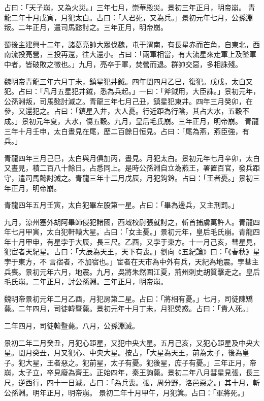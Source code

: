 \begin{pinyinscope}
 占曰：「天子崩，又為火災。」三年七月，崇華殿災。景初三年正月，明帝崩。
 青龍二年十月戊寅，月犯太白。占曰：「人君死，又為兵。」景初元年七月，公孫淵叛。二年正月，遣司馬懿討之。三年正月，明帝崩。



 蜀後主建興十二年，諸葛亮帥大眾伐魏，屯于渭南，有長星赤而芒角，自東北，西南流投亮營，三投再還，往大還小。占曰：「兩軍相當，有大流星來走軍上及墜軍中者，皆破敗之徵也。」九月，亮卒于軍，焚營而退。群帥交惡，多相誅殘。



 魏明帝青龍三年六月丁未，鎮星犯井鉞。四年閏四月乙巳，復犯。戊戌，太白又犯。占曰：「凡月五星犯井鉞，悉為兵起。」一曰：「斧鉞用，大臣誅。」景初元年，公孫淵叛，司馬懿討滅之。青龍三年七月己丑，鎮星犯東井。四年三月癸卯，在參，又還犯之。占曰：「鎮星入井，大人憂。行近距為行陰，其占大水，五穀不成。」景初元年夏，大水，傷五穀。九月，皇后毛氏崩。三年正月，明帝崩。
 青龍三年十月壬申，太白晝見在尾，歷二百餘日恒見。占曰：「尾為燕，燕臣強，有兵。」



 青龍四年三月己巳，太白與月俱加丙，晝見。月犯太白。景初元年七月辛卯，太白又晝見，積二百八十餘日。占悉同上。是時公孫淵自立為燕王，署置百官，發兵距守，遣司馬懿討滅之。青龍三年十二月戊辰，月犯鉤鈐。占曰：「王者憂。」景初三年正月，明帝崩。



 青龍四年五月壬寅，太白犯畢左股第一星。占曰：「畢為邊兵，又主刑罰。」



 九月，涼州塞外胡阿畢師侵犯諸國，西域校尉張就討之，斬首捕虜萬許人。青龍四年七月甲寅，太白犯軒轅大星。占曰：「女主憂。」景初元年，皇后毛氏崩。青龍四年十月甲申，有星孛于大辰，長三尺。乙酉，又孛于東方。十一月己亥，彗星見，犯宦者天紀星。占曰：「大辰為天王，天下有喪。」劉向《五紀論》曰：「《春秋》星孛于東方，不
 言宿者，不加宿也。」宦者在天市為中外有兵，天紀為地震。孛彗主兵喪。景初元年六月，地震。九月，吳將朱然圍江夏，荊州刺史胡質擊走之。皇后毛氏崩。二年正月，討公孫淵。三年正月，明帝崩。



 魏明帝景初元年二月乙酉，月犯房第二星。占曰：「將相有憂。」七月，司徒陳矯薨。二年四月，司徒韓暨薨。景初元年十月丁未，月犯熒惑。占曰：「貴人死。」



 二年四月，司徒韓暨薨。八月，公孫淵滅。



 景初二年二月癸丑，月犯心距星，又犯中央大星。五月己亥，又犯心距星及中央大星。閏月癸丑，月又犯心、中央大星。按占，「大星為天王，前為太子，後為皇子。犯大星，王者惡之。犯前星，太子有憂。犯後星，庶子有憂。」三年正月，帝崩，太子立，卒見廢為齊王。正始四年，秦王詢薨。景初二年八月彗星見張，長三尺，逆西行，四十一日滅。占曰：「為兵喪。張，周分野，洛邑惡之。」其十月，斬公孫淵。明年正月，明帝崩。
 景初二年十月甲午，月犯箕。占曰：「軍將死。」




\end{pinyinscope}
